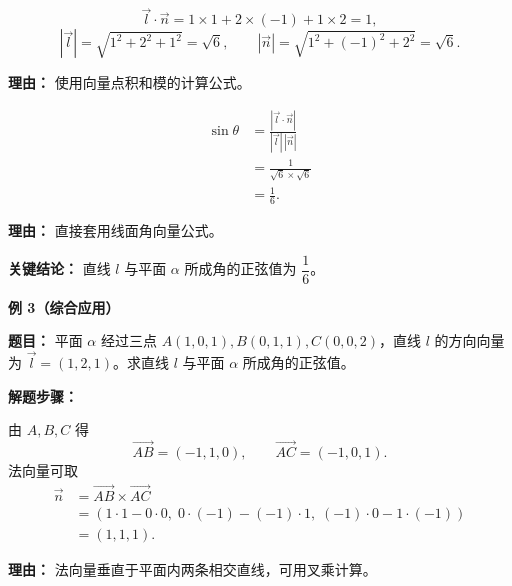 \begin{examplebox}
\begin{description}[style=nextline, leftmargin=2.8em, labelsep=0.5em, itemsep=0.45em]
		\item[\textbf{第二步（计算点积和模）：}]
		      \[
			      \vec{l}\cdot\vec{n}=1\times1+2\times(-1)+1\times2=1,
		      \]
		      \[
			      |\vec{l}|=\sqrt{1^2+2^2+1^2}=\sqrt{6},
			      \qquad
			      |\vec{n}|=\sqrt{1^2+(-1)^2+2^2}=\sqrt{6}.
		      \]
		      \par\textbf{理由：}
		      使用向量点积和模的计算公式。

		\item[\textbf{第三步（代入公式）：}]
		      \[
			      \begin{aligned}
				      \sin\theta
				       & = \frac{|\vec{l}\cdot\vec{n}|}{|\vec{l}|\,|\vec{n}|} \\
				       & = \frac{1}{\sqrt{6}\times\sqrt{6}}                   \\
				       & = \frac{1}{6}.
			      \end{aligned}
		      \]
		      \par\textbf{理由：}
		      直接套用线面角向量公式。
	\end{description}

	\textbf{\textcolor{CExample}{关键结论：}} 直线 $l$ 与平面 $\alpha$ 所成角的正弦值为 $\dfrac{1}{6}$。

	\medskip

	\textbf{\textcolor{CExample}{例 3（综合应用）}}

	\textbf{\textcolor{CExample}{题目：}} 平面 $\alpha$ 经过三点 $A(1,0,1),B(0,1,1),C(0,0,2)$，直线 $l$ 的方向向量为 $\vec{l}=(1,2,1)$。求直线 $l$ 与平面 $\alpha$ 所成角的正弦值。

	\textbf{\textcolor{CExample}{解题步骤：}}

	\begin{description}[style=nextline, leftmargin=2.8em, labelsep=0.5em, itemsep=0.45em]
		\item[\textbf{第一步（求平面法向量）：}]
		      由 $A,B,C$ 得
		      \[
			      \overrightarrow{AB}=(-1,1,0),
			      \qquad
			      \overrightarrow{AC}=(-1,0,1).
		      \]
		      法向量可取
		      \[
			      \begin{aligned}
				      \vec{n}
				       & =\overrightarrow{AB}\times\overrightarrow{AC} \\
				       & =(1\cdot1-0\cdot0,
				      \;0\cdot(-1)-(-1)\cdot1,
				      \;(-1)\cdot0-1\cdot(-1))                         \\
				       & =(1,1,1).
			      \end{aligned}
		      \]
		      \par\textbf{理由：}
		      法向量垂直于平面内两条相交直线，可用叉乘计算。


\end{description}
\end{examplebox}
